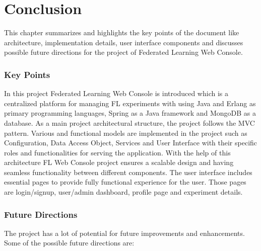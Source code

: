 \chapter{Conclusion}


This chapter summarizes and highlights the key points of the document like architecture, implementation details, user interface components and
discusses possible future directions for the project of Federated Learning Web Console.


\subsection*{Key Points}
In this project Federated Learning Web Console is introduced which is a centralized platform for managing FL experiments with using Java and Erlang as primary programming languages,
Spring as a Java framework and MongoDB as a database. As a main project architectural structure, the project follows the MVC pattern. Various and functional models are implemented in
the project such as Configuration, Data Access Object, Services and User Interface with their specific roles and functionalities for serving the application. With the help of this
architecture FL Web Console project ensures a scalable design and having seamless functionality between different components. The user interface includes essential pages to provide
fully functional experience for the user. Those pages are login/signup, user/admin dashboard, profile page and experiment details.

\subsection*{Future Directions}
The project has a lot of potential for future improvements and enhancements. Some of the possible future directions are:
